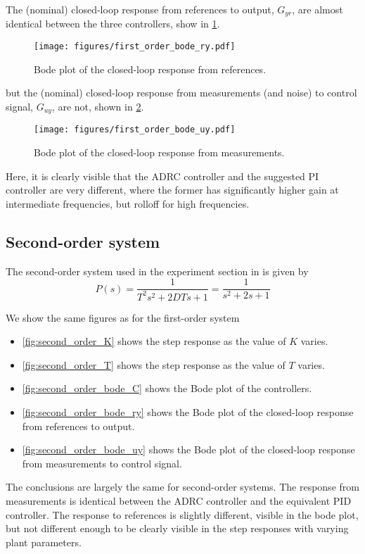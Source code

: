\documentclass[letterpaper, 10 pt, conference]{ieeeconf}
\begin{document}
The (nominal) closed-loop response from references to output, $G_{yr}$, are almost identical between the three controllers, show in \cref{fig:first_order_bode_ry}.
\begin{figure}[h]
	\centering
	\texttt{[image: figures/first\_order\_bode\_ry.pdf]}
	\caption{Bode plot of the closed-loop response from references.}
	\label{fig:first_order_bode_ry}
\end{figure}

but the (nominal) closed-loop response from measurements (and noise) to control signal, $G_{uy}$, are not, shown in \cref{fig:first_order_bode_uy}.
\begin{figure}[h]
	\centering
	\texttt{[image: figures/first\_order\_bode\_uy.pdf]}
	\caption{Bode plot of the closed-loop response from measurements.}
	\label{fig:first_order_bode_uy}
\end{figure}
Here, it is clearly visible that the ADRC controller and the suggested PI controller are very different, where the former has significantly higher gain at intermediate frequencies, but rolloff for high frequencies.

\subsection{Second-order system}
The second-order system used in the experiment section in \cite{herbst2013simulative} is given by
$$P(s) = \dfrac{1}{T^2s^2 + 2DTs + 1} = \dfrac{1}{s^2 + 2s + 1}$$

We show the same figures as for the first-order system
\begin{itemize}
	\item \cref{fig:second_order_K} shows the step response as the value of $K$ varies.
	\item \cref{fig:second_order_T} shows the step response as the value of $T$ varies.
	\item \cref{fig:second_order_bode_C} shows the Bode plot of the controllers.
	\item \cref{fig:second_order_bode_ry} shows the Bode plot of the closed-loop response from references to output.
	\item \cref{fig:second_order_bode_uy} shows the Bode plot of the closed-loop response from measurements to control signal.
\end{itemize}
The conclusions are largely the same for second-order systems. The response from measurements is identical between the ADRC controller and the equivalent PID controller. The response to references is slightly different, visible in the bode plot, but not different enough to be clearly visible in the step responses with varying plant parameters.
\end{document}
